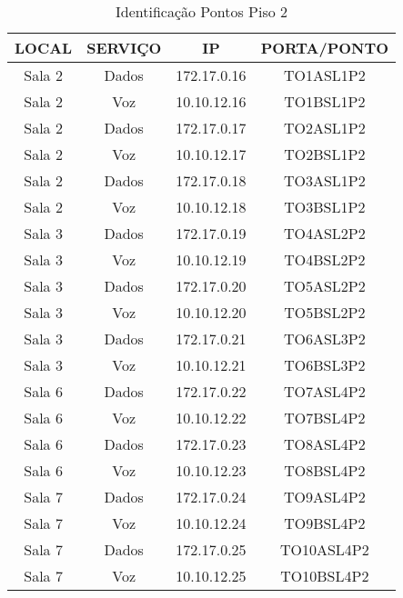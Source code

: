 \begin{table}[]
\centering
\caption{Identificação Pontos Piso 2}
\label{pontos_p2}
\begin{tabular}{cccc}
\hline
\textbf{LOCAL}  & \textbf{SERVIÇO} & \textbf{IP} & \textbf{PORTA/PONTO} \\ \hline
Sala 2          & Dados            & 172.17.0.16 & TO1ASL1P2            \\ \hline
Sala 2          & Voz              & 10.10.12.16 & TO1BSL1P2            \\ \hline
Sala 2          & Dados            & 172.17.0.17 & TO2ASL1P2            \\ \hline
Sala 2          & Voz              & 10.10.12.17 & TO2BSL1P2            \\ \hline
Sala 2          & Dados            & 172.17.0.18 & TO3ASL1P2            \\ \hline
Sala 2          & Voz              & 10.10.12.18 & TO3BSL1P2            \\ \hline
Sala 3          & Dados            & 172.17.0.19 & TO4ASL2P2            \\ \hline
Sala 3          & Voz              & 10.10.12.19 & TO4BSL2P2            \\ \hline
Sala 3          & Dados            & 172.17.0.20 & TO5ASL2P2            \\ \hline
Sala 3          & Voz              & 10.10.12.20 & TO5BSL2P2            \\ \hline
Sala 3          & Dados            & 172.17.0.21 & TO6ASL3P2            \\ \hline
Sala 3          & Voz              & 10.10.12.21 & TO6BSL3P2            \\ \hline
Sala 6          & Dados            & 172.17.0.22 & TO7ASL4P2            \\ \hline
Sala 6          & Voz              & 10.10.12.22 & TO7BSL4P2            \\ \hline
Sala 6          & Dados            & 172.17.0.23 & TO8ASL4P2            \\ \hline
Sala 6          & Voz              & 10.10.12.23 & TO8BSL4P2            \\ \hline
Sala 7          & Dados            & 172.17.0.24 & TO9ASL4P2            \\ \hline
Sala 7          & Voz              & 10.10.12.24 & TO9BSL4P2            \\ \hline
Sala 7          & Dados            & 172.17.0.25 & TO10ASL4P2           \\ \hline
Sala 7          & Voz              & 10.10.12.25 & TO10BSL4P2           \\ \hline
\end{tabular}
\end{table}